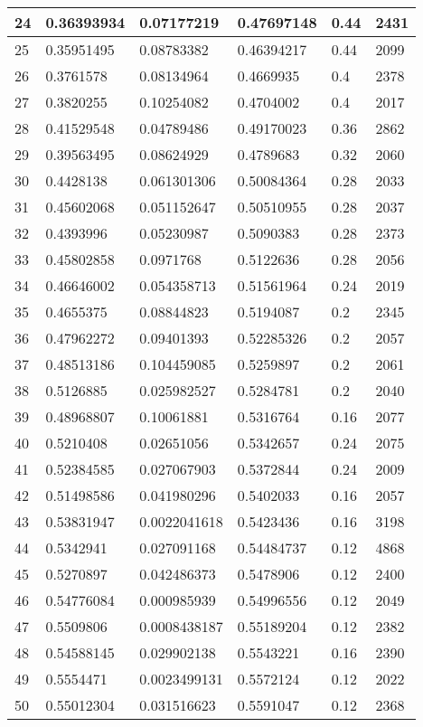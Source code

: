 \begin{longtable}{|l|l|l|l|l|l|}
24 & 0.36393934 & 0.07177219 & 0.47697148 & 0.44 & 2431 \\ \hline 
25 & 0.35951495 & 0.08783382 & 0.46394217 & 0.44 & 2099 \\ \hline 
26 & 0.3761578 & 0.08134964 & 0.4669935 & 0.4 & 2378 \\ \hline 
27 & 0.3820255 & 0.10254082 & 0.4704002 & 0.4 & 2017 \\ \hline 
28 & 0.41529548 & 0.04789486 & 0.49170023 & 0.36 & 2862 \\ \hline 
29 & 0.39563495 & 0.08624929 & 0.4789683 & 0.32 & 2060 \\ \hline 
30 & 0.4428138 & 0.061301306 & 0.50084364 & 0.28 & 2033 \\ \hline 
31 & 0.45602068 & 0.051152647 & 0.50510955 & 0.28 & 2037 \\ \hline 
32 & 0.4393996 & 0.05230987 & 0.5090383 & 0.28 & 2373 \\ \hline 
33 & 0.45802858 & 0.0971768 & 0.5122636 & 0.28 & 2056 \\ \hline 
34 & 0.46646002 & 0.054358713 & 0.51561964 & 0.24 & 2019 \\ \hline 
35 & 0.4655375 & 0.08844823 & 0.5194087 & 0.2 & 2345 \\ \hline 
36 & 0.47962272 & 0.09401393 & 0.52285326 & 0.2 & 2057 \\ \hline 
37 & 0.48513186 & 0.104459085 & 0.5259897 & 0.2 & 2061 \\ \hline 
38 & 0.5126885 & 0.025982527 & 0.5284781 & 0.2 & 2040 \\ \hline 
39 & 0.48968807 & 0.10061881 & 0.5316764 & 0.16 & 2077 \\ \hline 
40 & 0.5210408 & 0.02651056 & 0.5342657 & 0.24 & 2075 \\ \hline 
41 & 0.52384585 & 0.027067903 & 0.5372844 & 0.24 & 2009 \\ \hline 
42 & 0.51498586 & 0.041980296 & 0.5402033 & 0.16 & 2057 \\ \hline 
43 & 0.53831947 & 0.0022041618 & 0.5423436 & 0.16 & 3198 \\ \hline 
44 & 0.5342941 & 0.027091168 & 0.54484737 & 0.12 & 4868 \\ \hline 
45 & 0.5270897 & 0.042486373 & 0.5478906 & 0.12 & 2400 \\ \hline 
46 & 0.54776084 & 0.000985939 & 0.54996556 & 0.12 & 2049 \\ \hline 
47 & 0.5509806 & 0.0008438187 & 0.55189204 & 0.12 & 2382 \\ \hline 
48 & 0.54588145 & 0.029902138 & 0.5543221 & 0.16 & 2390 \\ \hline 
49 & 0.5554471 & 0.0023499131 & 0.5572124 & 0.12 & 2022 \\ \hline 
50 & 0.55012304 & 0.031516623 & 0.5591047 & 0.12 & 2368 \\ \hline 
\end{longtable}